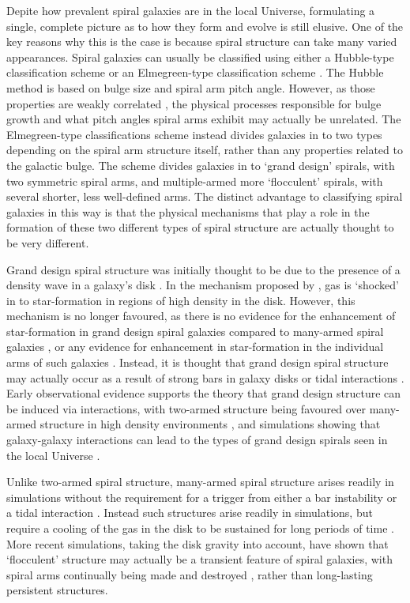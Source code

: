 \documentclass[useAMS,usenatbib]{mn2e}
\begin{document}
Depite how prevalent  spiral galaxies are in the local Universe, formulating a single, complete picture as to how they form and evolve is still elusive. One of the key reasons why this is the case is because spiral structure can take many varied appearances. Spiral galaxies can usually be classified using either a Hubble-type classification scheme \citep{Hubble_26} or an Elmegreen-type classification scheme \citep{EE_82,EE_87}. The Hubble method is based on bulge size and spiral arm pitch angle. However, as those properties are weakly correlated \citep{Kennicutt_81,Seigar_98}, the physical processes responsible for bulge growth and what pitch angles spiral arms exhibit may actually be unrelated. The Elmegreen-type classifications scheme instead divides galaxies in to two types depending on the spiral arm structure itself, rather than any properties related to the galactic bulge. The scheme divides galaxies in to `grand design' spirals, with two symmetric spiral arms, and multiple-armed more `flocculent' spirals, with several shorter, less well-defined arms. The distinct advantage to classifying spiral galaxies in this way is that the physical mechanisms that play a role in the formation of these two different types of spiral structure are actually thought to be very different.

Grand design spiral structure was initially thought to be due to the presence of a density wave in a galaxy's disk \citep{Lindblad_63,Lin_64}. In the mechanism proposed by \citet{Lin_64}, gas is `shocked' in to star-formation in regions of high density in the disk. However, this mechanism is no longer favoured, as there is no evidence for the enhancement of star-formation in grand design spiral galaxies compared to many-armed spiral galaxies \citep{Romanishin_85,EE_86}, or any evidence for enhancement in star-formation in the individual arms of such galaxies \citep{Foyle_11,Choi_15}. Instead, it is thought that grand design spiral structure may actually occur as a result of strong bars in galaxy disks or tidal interactions \citep{Kormendy_79}. Early observational evidence supports the theory that grand design structure can be induced via interactions, with two-armed structure being favoured over many-armed structure in high density environments \citep{EE_82,EE_87,Ann_14}, and simulations showing that galaxy-galaxy interactions can lead to the types of grand design spirals seen in the local Universe \citep{Dobbs_10,Semczuk_15}. 

Unlike two-armed spiral structure, many-armed spiral structure arises readily in simulations without the requirement for a trigger from either a bar instability or a tidal interaction \citep{James_78,Sellwood_84}. Instead such structures arise readily in simulations, but require a cooling of the gas in the disk to be sustained for long periods of time \citep{Carlberg_85}. More recent simulations, taking the disk gravity into account, have shown that `flocculent' structure may actually be a transient feature of spiral galaxies, with spiral arms continually being made and destroyed \citep{Bottema_03,Grand_12b,Baba_09,Baba_13,Donghia_13}, rather than long-lasting persistent structures.
\end{document}

